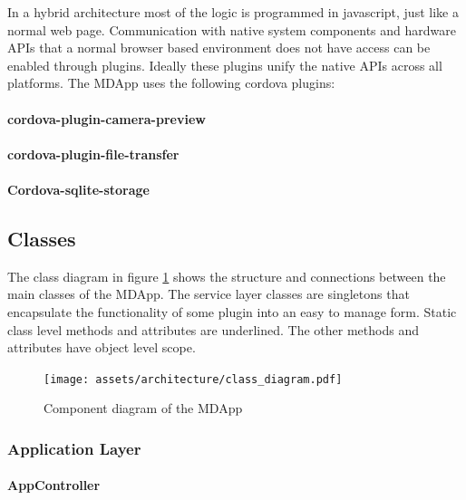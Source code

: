 In a hybrid architecture most of the logic is programmed in javascript, just like a normal web page. Communication with native system components and hardware APIs that a normal browser based environment does not have access can be enabled through plugins. Ideally these plugins unify the native APIs across all platforms. The MDApp uses the following cordova plugins:

   \paragraph{cordova-plugin-camera-preview}
   \paragraph{cordova-plugin-file-transfer}
   \paragraph{Cordova-sqlite-storage}

\subsection{Classes}

The class diagram in figure \ref{fig:class_dia} shows the structure and connections between the main classes of the MDApp. The service layer classes are singletons that encapsulate the functionality of some plugin into an easy to manage form. Static class level methods and attributes are underlined. The other methods and attributes have object level scope.

\begin{figure}[H]
    \centering
    \texttt{[image: assets/architecture/class\_diagram.pdf]}
    \caption{Component diagram of the MDApp}
    \label{fig:class_dia}
\end{figure}

    \subsubsection{Application Layer}
        \paragraph{AppController}
            


